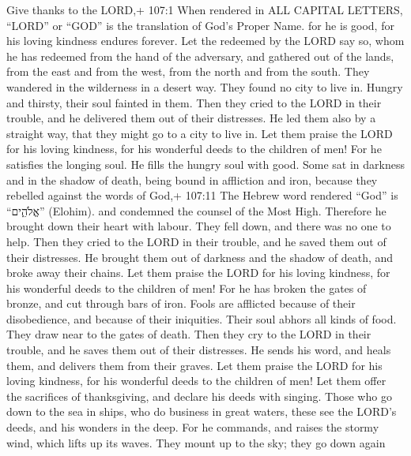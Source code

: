  Give thanks to the LORD,+ 107:1 When rendered in ALL
CAPITAL LETTERS, ``LORD'' or ``GOD'' is the translation of God's Proper
Name. for he is good, for his loving kindness endures forever.
 Let the redeemed by the LORD say so, whom he has redeemed
from the hand of the adversary,  and gathered out of the
lands, from the east and from the west, from the north and from the
south.  They wandered in the wilderness in a desert way.
They found no city to live in.  Hungry and thirsty, their
soul fainted in them.  Then they cried to the LORD in their
trouble, and he delivered them out of their distresses.  He
led them also by a straight way, that they might go to a city to live
in.  Let them praise the LORD for his loving kindness, for
his wonderful deeds to the children of men!  For he
satisfies the longing soul. He fills the hungry soul with good.
 Some sat in darkness and in the shadow of death, being
bound in affliction and iron,  because they rebelled
against the words of God,+ 107:11 The Hebrew word rendered ``God'' is
``אֱלֹהִ֑ים'' (Elohim). and condemned the counsel of the Most High.
 Therefore he brought down their heart with labour. They
fell down, and there was no one to help.  Then they cried
to the LORD in their trouble, and he saved them out of their distresses.
 He brought them out of darkness and the shadow of death,
and broke away their chains.  Let them praise the LORD for
his loving kindness, for his wonderful deeds to the children of men!
 For he has broken the gates of bronze, and cut through
bars of iron.  Fools are afflicted because of their
disobedience, and because of their iniquities.  Their soul
abhors all kinds of food. They draw near to the gates of death.
 Then they cry to the LORD in their trouble, and he saves
them out of their distresses.  He sends his word, and heals
them, and delivers them from their graves.  Let them praise
the LORD for his loving kindness, for his wonderful deeds to the
children of men!  Let them offer the sacrifices of
thanksgiving, and declare his deeds with singing.  Those
who go down to the sea in ships, who do business in great waters,
 these see the LORD's deeds, and his wonders in the deep.
 For he commands, and raises the stormy wind, which lifts
up its waves.  They mount up to the sky; they go down again

